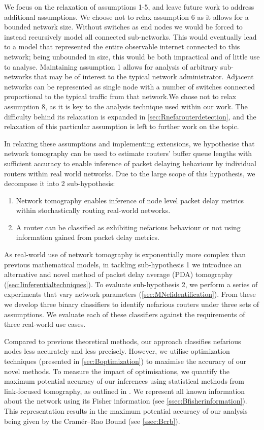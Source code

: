We focus on the relaxation of assumptions 1-5, and leave future work to address additional assumptions. We choose not to relax assumption 6 as it allows for a bounded network size. Without switches as end nodes we would be forced to instead recursively model all connected sub-networks. This would eventually lead to a model that represented the entire observable internet connected to this network; being unbounded in size, this would be both impractical and of little use to analyse. Maintaining assumption 1 allows for analysis of arbitrary sub-networks that may be of interest to the typical network administrator. Adjacent networks can be represented as single node with a number of switches connected proportional to the typical traffic from that network.We chose not to relax assumption 8, as it is key to the analysis technique used within our work. The difficulty behind its relaxation is expanded in \cref{sec:Rnefarouterdetection}, and the relaxation of this particular assumption is left to further work on the topic.\par
In relaxing these assumptions and implementing extensions, we hypothesise that network tomography can be used to estimate routers' buffer queue lengths with sufficient accuracy to enable inference of packet delaying behaviour by individual routers within real world networks. Due to the large scope of this hypothesis, we decompose it into 2 sub-hypothesis:
\begin{enumerate}
    \item Network tomography enables inference of node level packet delay metrics within stochastically routing real-world networks.
    \item A router can be classified as exhibiting nefarious behaviour or not using information gained from packet delay metrics.
\end{enumerate}
As real-world use of network tomography is exponentially more complex than previous mathematical models, in tackling sub-hypothesis 1 we introduce an alternative and novel method of packet delay average (PDA) tomography (\cref{sec:Iinferentialtechniques}). To evaluate sub-hypothesis 2, we perform a series of experiments that vary network parameters (\cref{sec:MNefidentification}). From these we develop three binary classifiers to identify nefarious routers under three sets of assumptions. We evaluate each of these classifiers against the requirements of three real-world use cases.\par
Compared to previous theoretical methods, our approach classifies nefarious nodes less accurately and less precisely. However, we utilise optimization techniques (presented in \cref{sec:Boptimization}) to maximise the accuracy of our novel methods. To measure the impact of optimisations, we quantify the maximum potential accuracy of our inferences using statistical methods from link-focused tomography, as outlined in \cite{he_fisher_2015}. We represent all known information about the network using its Fisher information (see \cref{ssec:Bfisherinformation}). This representation results in the maximum potential accuracy of our analysis being given by the Cramér–Rao Bound (see \cref{ssec:Bcrb}).\par
